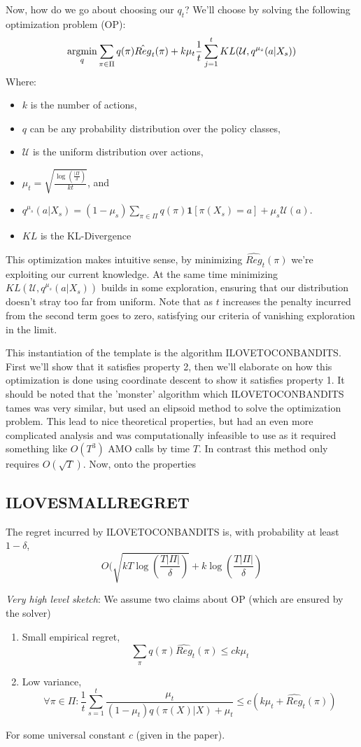 \documentclass[11pt]{article}
\begin{document}
Now, how do we go about choosing our $q_t$? We'll choose by solving the following optimization problem (OP):
$$\operatorname*{argmin}_q \sum_{\pi \in \Pi}q(\pi) \hat{Reg}_t(\pi) + k \mu_t \frac{1}{t} \sum_{j=1}^{t} KL(\mathcal{U}, q^{\mu_s}(a|X_s))$$
Where:
\begin{itemize}
	\item $k$ is the number of actions,
	\item $q$ can be any probability distribution over the policy classes,
	\item $\mathcal{U}$ is the uniform distribution over actions,
	\item $\mu_t = \sqrt{\frac{\log(\frac{|\Pi}{\delta})}{k t}}$, and
	\item $q^{\mu_s}(a|X_s) = (1-\mu_s) \sum_{\pi \in \Pi} q(\pi)\mathbf{1}[\pi(X_s) = a] + \mu_s \mathcal{U}(a)$.
	\item $KL$ is the KL-Divergence
\end{itemize}
This optimization makes intuitive sense, by minimizing $\hat{Reg}_t(\pi)$ we're exploiting our current knowledge. At the same time minimizing $KL(\mathcal{U}, q^{\mu_s}(a|X_s))$ builds in some exploration, ensuring that our distribution doesn't stray too far from uniform. Note that as $t$ increases the penalty incurred from the second term goes to zero, satisfying our criteria of vanishing exploration in the limit.

This instantiation of the template is the algorithm ILOVETOCONBANDITS. First we'll show that it satisfies property 2, then we'll elaborate on how this optimization is done using coordinate descent to show it satisfies property 1. It should be noted that the 'monster' algorithm which ILOVETOCONBANDITS tames was very similar, but used an elipsoid method to solve the optimization problem. This lead to nice theoretical properties, but had an even more complicated analysis and was computationally infeasible to use as it required something like $O(T^3)$ AMO calls by time $T$. In contrast this method only requires $O(\sqrt{T})$. Now, onto the properties

\subsection{ILOVESMALLREGRET}
\begin{theorem}
	The regret incurred by ILOVETOCONBANDITS is, with probability at least $1-\delta$,
	$$O(\sqrt{k T \log(\frac{T |\Pi|}{\delta})} + k \log(\frac{T |\Pi|}{\delta})$$
\end{theorem}
\textit{Very high level sketch}: We assume two claims about OP (which are ensured by the solver)
\begin{enumerate}
	\item Small empirical regret,
	$$\sum_{\pi} q(\pi) \hat{Reg}_t(\pi) \le c k \mu_t $$
	\item Low variance,
	$$ \forall \pi \in \Pi: \frac{1}{t} \sum_{s=1}^t \frac{\mu_t}{(1-\mu_t) q(\pi(X) | X) + \mu_t} \le c(k \mu_t +\hat{Reg}_t(\pi))$$
\end{enumerate}
For some universal constant $c$ (given in the paper).
\end{document}
